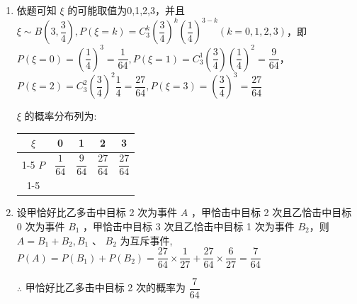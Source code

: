 \begin{enumerate}
\begin{enumerate}
\begin{jieda}
\begin{enumerate}
                \item 依题可知 $\xi$ 的可能取值为0,1,2,3，并且 $\xi  \sim  B\left( {3,\dfrac{3}{4}}\right) ,P\left( {\xi  = k}\right)  = {{C}}_{3}^{k}{\left( \dfrac{3}{4}\right) }^{k}{\left( \dfrac{1}{4}\right) }^{3 - k}\left( {k = 0,1,2,3}\right)$，即 $P\left( {\xi  = 0}\right)  = {\left( \dfrac{1}{4}\right) }^{3} = \dfrac{1}{64},P\left( {\xi  = 1}\right)  = {{C}}_{3}^{1}\left( \dfrac{3}{4}\right) {\left( \dfrac{1}{4}\right) }^{2} = \dfrac{9}{64}$，$P\left( {\xi  = 2}\right)  = {{C}}_{3}^{2}{\left( \dfrac{3}{4}\right) }^{2}\dfrac{1}{4} = \dfrac{27}{64},P\left( {\xi  = 3}\right)  = {\left( \dfrac{3}{4}\right) }^{3} = \dfrac{27}{64}$
                
                $\xi$ 的概率分布列为:
                
                \begin{center}
                
                \begin{tabular}{|c|c|c|c|c|}
                \hline
                $\xi$ & 0 & 1 & 2 & 3 \\
                \cline{1-5}
                $P$ & $\dfrac{1}{64}$ & $\dfrac{9}{64}$ & $\dfrac{27}{64}$ & $\dfrac{27}{64}$ \\
                \cline{1-5}
                \hline
                \end{tabular}
                
                \end{center}

                \item 设甲恰好比乙多击中目标 2 次为事件 $A$ ，甲恰击中目标 2 次且乙恰击中目标 0 次为事件 ${B}_{1}$ ，甲恰击中目标 3 次且乙恰击中目标 1 次为事件 ${B}_{2}$，则 $A = {B}_{1} + {B}_{2},{B}_{1}\text{ 、 }{B}_{2}$ 为互斥事件, $P\left( A\right)  = P\left( {B}_{1}\right)  + P\left( {B}_{2}\right)  = \dfrac{27}{64} \times  \dfrac{1}{27} + \dfrac{27}{64} \times  \dfrac{6}{27} = \dfrac{7}{64}$
                
                $\therefore$ 甲恰好比乙多击中目标 2 次的概率为 $\dfrac{7}{64}$
            \end{enumerate}
        \end{jieda}
        

\end{enumerate}
\end{enumerate}
